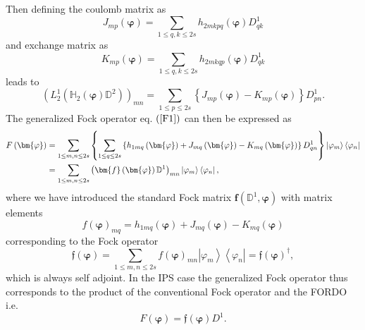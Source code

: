 \documentclass{preprint}
\begin{document}
Then defining the coulomb matrix as
\begin{equation}
J_{mp}\left( \bm{\varphi}\right) =\sum_{1\leq q,k\leq2s}h_{2mkpq}\left( %
\bm{\varphi}\right) D_{qk}^{1}
\end{equation}
and exchange matrix as
\begin{equation}
K_{mp}\left( \bm{\varphi}\right) =\sum_{1\leq q,k\leq2s}h_{2mkqp}\left( %
\bm{\varphi}\right) D_{qk}^{1}
\end{equation}
leads to
\begin{equation}
\left( L_{2}^{1}\left( \mathbb{H}_{2}\left( \bm{\varphi}\right) \mathbb{D}%
^{2}\right) \right) _{mn}=\sum_{1\leq p\leq2s}\left\{ J_{mp}\left( %
\bm{\varphi}\right) -K_{mp}\left( \bm{\varphi}\right) \right\} D_{pn}^{1}.
\end{equation}
The generalized Fock operator eq. $\left( \ref{F1}\right) $ can then be
expressed as
\begin{align}
F\left( \bm{\varphi}\right) & =\sum_{1\leq m,n\leq2s}\left\{ \sum_{1\leq
q\leq2s}\left\{ h_{1mq}\left( \bm{\varphi}\right) +J_{mq}\left( \bm{\varphi}%
\right) -K_{mq}\left( \bm{\varphi }\right) \right\} D_{qn}^{1}\right\}
\left\vert \varphi_{m}\right\rangle \left\langle \varphi _{n}\right\vert
\notag \\
& =\sum_{1\leq m,n\leq2s}\left( \bm{f}\left( \bm{\varphi}\right) \mathbb{D}%
^{1}\right) _{mn}\left\vert \varphi_{m}\right\rangle \left\langle
\varphi_{n}\right\vert ,
\end{align}
where we have introduced the standard Fock matrix $\bm{f}\left( \mathbb{D}%
^{1},\bm{\varphi}\right) $ with matrix elements
\begin{equation}
f\left( \bm{\varphi}\right) _{mq}=h_{1mq}\left( \bm{\varphi }\right)
+J_{mq}\left( \bm{\varphi}\right) -K_{mq}\left( \bm{\varphi}\right)
\end{equation}
corresponding to the Fock operator
\begin{equation}
\mathfrak{f}\left( \bm{\varphi}\right) =\sum_{1\leq m,n\leq2s}f\left( %
\bm{\varphi}\right) _{mn}\left\vert \varphi_{m}\right\rangle \left\langle
\varphi_{n}\right\vert =\mathfrak{f}\left( \bm{\varphi}\right) ^{\dagger},
\end{equation}
which is always self adjoint. In the IPS case the generalized Fock operator
thus corresponds to the product of the conventional Fock operator and the
FORDO i.e.
\begin{equation}
F\left( \bm{\varphi}\right) =\mathfrak{f}\left( \bm{\varphi }\right) D^{1}.
\end{equation}
\end{document}
